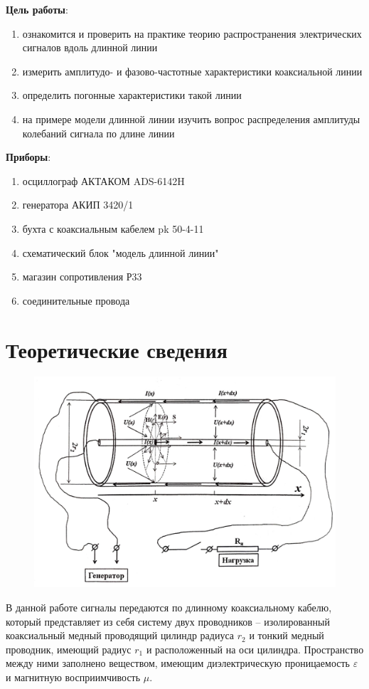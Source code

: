\documentclass{report}
\begin{document}
\graphicspath{{figures}}


\textbf{Цель работы}:
\begin{enumerate}
	\item ознакомится и проверить на практике теорию распространения
	      электрических сигналов вдоль длинной линии
	\item измерить амплитудо- и фазово-частотные характеристики коаксиальной линии
	\item определить погонные характеристики такой линии
	\item на примере модели длинной линии изучить вопрос распределения
	      амплитуды колебаний сигнала по длине линии
\end{enumerate}

\textbf{Приборы}:
\begin{enumerate}
	\item осциллограф АКТАКОМ ADS-6142H
	\item генератора АКИП 3420/1
	\item бухта с коаксиальным кабелем pk 50-4-11
	\item схематический блок "модель длинной линии"
	\item магазин сопротивления Р33
	\item соединительные провода
\end{enumerate}

\section{Теоретические сведения}
\begin{figure}[H]
	\centering
	\includegraphics[scale=0.4]{figures/2024-10-24_22-17.png}
\end{figure}
В данной работе сигналы передаются по длинному коаксиальному кабелю, который
представляет из себя систему двух проводников -- изолированный коаксиальный
медный проводящий цилиндр радиуса $r_2$ и тонкий медный проводник, имеющий
радиус $r_1$ и расположенный на оси цилиндра. Пространство между ними заполнено
веществом, имеющим диэлектрическую проницаемость $\varepsilon$ и магнитную
восприимчивость $\mu$.
\end{document}
